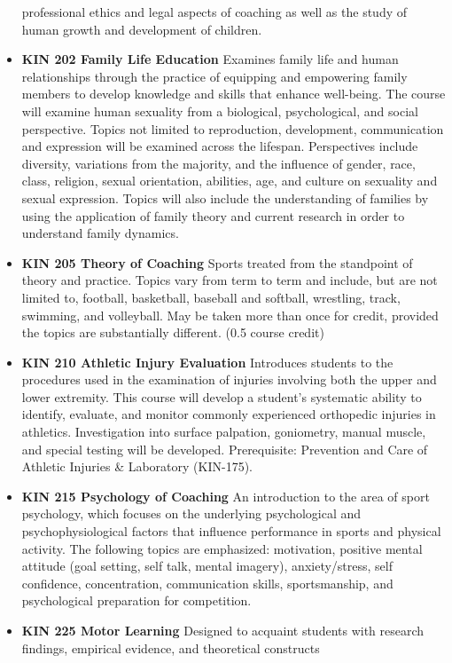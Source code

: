 \documentclass[
  letterpaper,
]{scrbook}
\begin{document}
\begin{itemize}
  professional ethics and legal aspects of coaching as well as the study
  of human growth and development of children.
\item
  \textbf{KIN 202 Family Life Education} Examines family life and human
  relationships through the practice of equipping and empowering family
  members to develop knowledge and skills that enhance well-being. The
  course will examine human sexuality from a biological, psychological,
  and social perspective. Topics not limited to reproduction,
  development, communication and expression will be examined across the
  lifespan. Perspectives include diversity, variations from the
  majority, and the influence of gender, race, class, religion, sexual
  orientation, abilities, age, and culture on sexuality and sexual
  expression. Topics will also include the understanding of families by
  using the application of family theory and current research in order
  to understand family dynamics.
\item
  \textbf{KIN 205 Theory of Coaching} Sports treated from the standpoint
  of theory and practice. Topics vary from term to term and include, but
  are not limited to, football, basketball, baseball and softball,
  wrestling, track, swimming, and volleyball. May be taken more than
  once for credit, provided the topics are substantially different. (0.5
  course credit)
\item
  \textbf{KIN 210 Athletic Injury Evaluation} Introduces students to the
  procedures used in the examination of injuries involving both the
  upper and lower extremity. This course will develop a student's
  systematic ability to identify, evaluate, and monitor commonly
  experienced orthopedic injuries in athletics. Investigation into
  surface palpation, goniometry, manual muscle, and special testing will
  be developed. Prerequisite: Prevention and Care of Athletic Injuries
  \& Laboratory (KIN-175).
\item
  \textbf{KIN 215 Psychology of Coaching} An introduction to the area of
  sport psychology, which focuses on the underlying psychological and
  psychophysiological factors that influence performance in sports and
  physical activity. The following topics are emphasized: motivation,
  positive mental attitude (goal setting, self talk, mental imagery),
  anxiety/stress, self confidence, concentration, communication skills,
  sportsmanship, and psychological preparation for competition.
\item
  \textbf{KIN 225 Motor Learning} Designed to acquaint students with
  research findings, empirical evidence, and theoretical constructs

\end{itemize}
\end{document}
